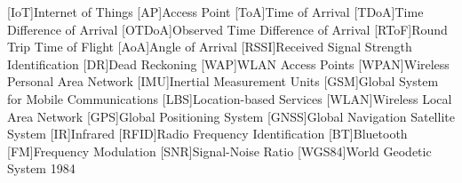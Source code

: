 \begin{acronym}[OTDoA]
	[IoT]{Internet of Things}
	[AP]{Access Point}
	[ToA]{Time of Arrival}
	[TDoA]{Time Difference of Arrival}
	[OTDoA]{Observed Time Difference of Arrival}
	[RToF]{Round Trip Time of Flight}
	[AoA]{Angle of Arrival}
	[RSSI]{Received Signal Strength Identification}
	[DR]{Dead Reckoning}
	[WAP]{WLAN Access Points}
	[WPAN]{Wireless Personal Area Network}
	[IMU]{Inertial Measurement Units}
	[GSM]{Global System for Mobile Communications}
	[LBS]{Location-based Services}
	[WLAN]{Wireless Local Area Network}
	[GPS]{{Global Positioning System}}
	[GNSS]{Global Navigation Satellite System}
	[IR]{Infrared}
	[RFID]{Radio	Frequency Identification}
	[BT]{Bluetooth}
	[FM]{Frequency Modulation}
	[SNR]{Signal-Noise Ratio}
	[WGS84]{World Geodetic System 1984}
\end{acronym}
